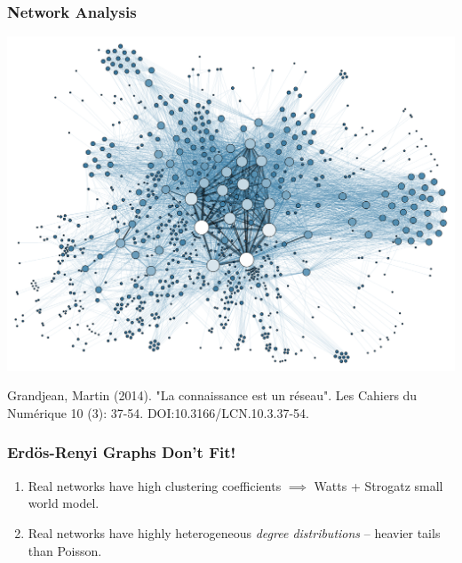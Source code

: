 \documentclass{beamer}
\begin{document}
		\begin{frame}\frametitle{Network Analysis}
		\centering
			\includegraphics[width=.8\textwidth]{Social_Network_Analysis_Visualization}

		  	Grandjean, Martin (2014). "La connaissance est un réseau". Les Cahiers du Numérique 10 (3): 37-54. DOI:10.3166/LCN.10.3.37-54.
		\end{frame}
	
		\begin{frame}\frametitle{Erd\"{o}s-Renyi Graphs Don't Fit!}
		  	\begin{enumerate}
		  		\pause \item Real networks have high clustering coefficients $\implies$ Watts + Strogatz small world model.
		  		\pause \item Real networks have highly heterogeneous \emph{degree distributions} -- heavier tails than Poisson. 
		  	\end{enumerate}
		\end{frame}
	
		
\end{document}
